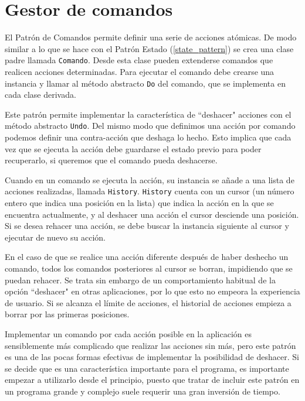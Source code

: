 
\section{Gestor de comandos}
\label{command_pattern}
El Patrón de Comandos permite definir una serie de acciones atómicas. De modo similar a lo que se hace con el Patrón Estado (\ref{state_pattern}) se crea una clase padre llamada \texttt{Comando}. Desde esta clase pueden extenderse comandos que realicen acciones determinadas. Para ejecutar el comando debe crearse una instancia y llamar al método abstracto \texttt{Do} del comando, que se implementa en cada clase derivada.

Este patrón permite implementar la característica de ``deshacer" acciones con el método abstracto \texttt{Undo}. Del mismo modo que definimos una acción por comando podemos definir una contra-acción que deshaga lo hecho. Esto implica que cada vez que se ejecuta la acción debe guardarse el estado previo para poder recuperarlo, si queremos que el comando pueda deshacerse.

Cuando en un comando se ejecuta la acción, su instancia se añade a una lista de acciones realizadas, llamada \texttt{History}. \texttt{History} cuenta con un cursor (un número entero que indica una posición en la lista) que indica la acción en la que se encuentra actualmente, y al deshacer una acción el cursor desciende una posición. Si se desea rehacer una acción, se debe buscar la instancia siguiente al cursor y ejecutar de nuevo su acción.

En el caso de que se realice una acción diferente después de haber deshecho un comando, todos los comandos posteriores al cursor se borran, impidiendo que se puedan rehacer. Se trata sin embargo de un comportamiento habitual de la opción ``deshacer" en otras aplicaciones, por lo que esto no empeora la experiencia de usuario. Si se alcanza el límite de acciones, el historial de acciones empieza a borrar por las primeras posiciones.

Implementar un comando por cada acción posible en la aplicación es sensiblemente más complicado que realizar las acciones sin más, pero este patrón es una de las pocas formas efectivas de implementar la posibilidad de deshacer. Si se decide que es una característica importante para el programa, es importante empezar a utilizarlo desde el principio, puesto que tratar de incluir este patrón en un programa grande y complejo suele requerir una gran inversión de tiempo.

